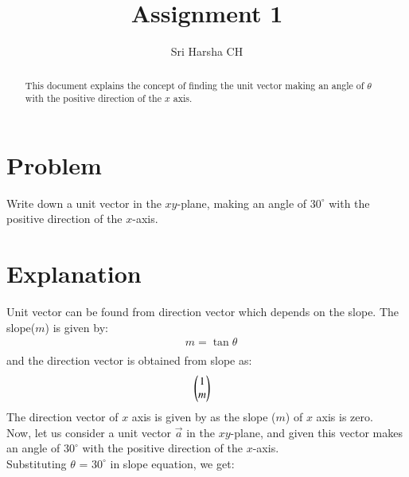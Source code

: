 \documentclass[journal,12pt,twocolumn]{IEEEtran}
\begin{document}
\renewcommand{\thefigure}{\theproblem}

\def\putbox#1#2#3{\makebox[0in][l]{\makebox[#1][l]{}\raisebox{\baselineskip}[0in][0in]{\raisebox{#2}[0in][0in]{#3}}}}
     \def\rightbox#1{\makebox[0in][r]{#1}}
     \def\centbox#1{\makebox[0in]{#1}}
     \def\topbox#1{\raisebox{-\baselineskip}[0in][0in]{#1}}
     \def\midbox#1{\raisebox{-0.5\baselineskip}[0in][0in]{#1}}
\vspace{3cm}
\title{Assignment 1}
\author{Sri Harsha CH}

\maketitle
\newpage

\bigskip
\renewcommand{\thefigure}{\theenumi}
\renewcommand{\thetable}{\theenumi}

\begin{abstract}
This document explains the concept of finding the unit vector making an angle of $\theta$ with the positive direction of the $x$ axis.
\end{abstract}
\section{Problem}

Write down a unit vector in the $xy$\nobreakdash-plane, making an angle of $30^{\circ}$ with the positive direction of the $x$-axis.
\section{Explanation}
Unit vector can be found from direction vector which depends on the slope.
The slope($m$) is given by:\\
 \begin{align*}
& m = \tan{\theta}\\ 
\end{align*}
 and the direction vector is obtained from slope as:\\
 \begin{align*}
& \begin{pmatrix}
1\\
m
\end{pmatrix}
\end{align*}
The direction vector of $x$ axis is given by  as the slope ($m$) of $x$ axis is zero.\\
Now, let us consider a unit vector $\vec{a}$ in the $xy$\nobreakdash-plane, and given this vector makes an angle of $30^{\circ}$ with the positive direction of the $x$-axis.\\
Substituting $\theta$ = $30^{\circ}$ in slope equation, we get:
\end{document}
